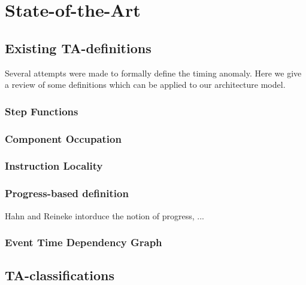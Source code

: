\chapter{State-of-the-Art}

\section{Existing TA-definitions}

Several attempts were made to formally define the timing anomaly. Here we give a review of some definitions which can be applied to our architecture model.

\subsection{Step Functions}
\subsection{Component Occupation}
\subsection{Instruction Locality}
\subsection{Progress-based definition}

Hahn and Reineke \cite{hahn_design_2020} intorduce the notion of progress, ... \cite{gruin_minotaur_2023 }

\subsection{Event Time Dependency Graph}



\section{TA-classifications}

